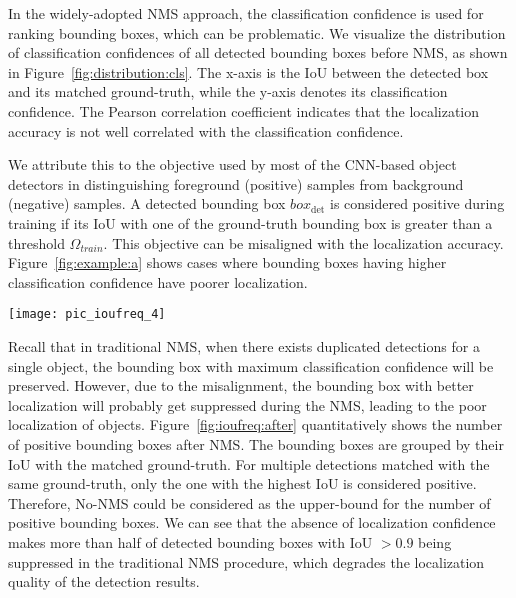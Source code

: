 \documentclass[runningheads]{llncs}
\begin{document}
In the widely-adopted NMS approach, the classification confidence is used for ranking bounding boxes, which can be problematic.
We visualize the distribution of classification confidences of all detected bounding boxes before NMS, as shown in Figure~\ref{fig:distribution:cls}. The x-axis is the IoU between the detected box and its matched ground-truth, while the y-axis denotes its classification confidence. The Pearson correlation coefficient indicates that the localization accuracy is not well correlated with the classification confidence.


We attribute this to the objective used by most of the CNN-based object detectors in distinguishing foreground (positive) samples from background (negative) samples. A detected bounding box $box_{\text{det}}$ is considered positive during training if its IoU with one of the ground-truth bounding box is greater than a threshold $\Omega_{train}$.
This objective can be misaligned with the localization accuracy. 
Figure~\ref{fig:example:a} shows cases where bounding boxes having higher classification confidence have poorer localization. 

\begin{SCfigure}
\centering
\texttt{[image: pic\_ioufreq\_4]}
\caption{
The number of positive bounding boxes after the NMS, grouped by their IoU with the matched ground-truth. 
In traditional NMS (blue bar), a significant portion of accurately localized bounding boxes get mistakenly suppressed due to the misalignment of classification confidence and localization accuracy, while IoU-guided NMS (yellow bar) preserves more accurately localized bounding boxes.
}
\label{fig:ioufreq:after}
\end{SCfigure}

Recall that in traditional NMS, when there exists duplicated detections for a single object, the bounding box with maximum classification confidence will be preserved. However, due to the misalignment, the bounding box with better localization will probably get suppressed during the NMS, leading to the poor localization of objects. Figure~\ref{fig:ioufreq:after} quantitatively shows the number of positive bounding boxes after NMS. The bounding boxes are grouped by their IoU with the matched ground-truth. For multiple detections matched with the same ground-truth, only the one with the highest IoU is considered positive. Therefore, No-NMS could be considered as the upper-bound for the number of positive bounding boxes. We can see that the absence of localization confidence makes more than half of detected bounding boxes with IoU $> 0.9$ being suppressed in the traditional NMS procedure, which degrades the localization quality of the detection results.
\end{document}
